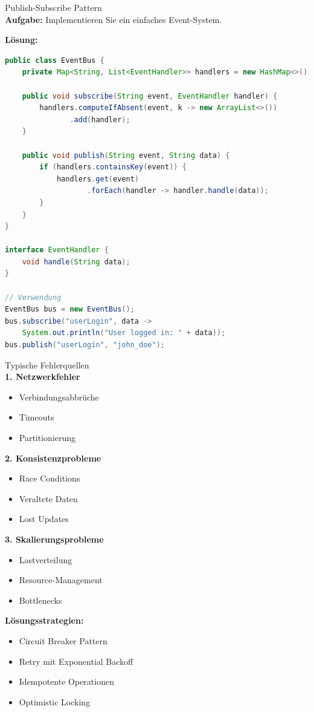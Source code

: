 \begin{example}{Publish-Subscribe Pattern}\\
\textbf{Aufgabe:} Implementieren Sie ein einfaches Event-System.

\textbf{Lösung:}
\begin{lstlisting}[language=Java, style=base]
public class EventBus {
    private Map<String, List<EventHandler>> handlers = new HashMap<>();
    
    public void subscribe(String event, EventHandler handler) {
        handlers.computeIfAbsent(event, k -> new ArrayList<>())
               .add(handler);
    }
    
    public void publish(String event, String data) {
        if (handlers.containsKey(event)) {
            handlers.get(event)
                   .forEach(handler -> handler.handle(data));
        }
    }
}

interface EventHandler {
    void handle(String data);
}

// Verwendung
EventBus bus = new EventBus();
bus.subscribe("userLogin", data -> 
    System.out.println("User logged in: " + data));
bus.publish("userLogin", "john_doe");
\end{lstlisting}
\end{example}

\begin{KR}{Typische Fehlerquellen}\\
\textbf{1. Netzwerkfehler}
\begin{itemize}
    \item Verbindungsabbrüche
    \item Timeouts
    \item Partitionierung
\end{itemize}

\textbf{2. Konsistenzprobleme}
\begin{itemize}
    \item Race Conditions
    \item Veraltete Daten
    \item Lost Updates
\end{itemize}

\textbf{3. Skalierungsprobleme}
\begin{itemize}
    \item Lastverteilung
    \item Resource-Management
    \item Bottlenecks
\end{itemize}

\textbf{Lösungsstrategien:}
\begin{itemize}
    \item Circuit Breaker Pattern
    \item Retry mit Exponential Backoff
    \item Idempotente Operationen
    \item Optimistic Locking
\end{itemize}
\end{KR}
